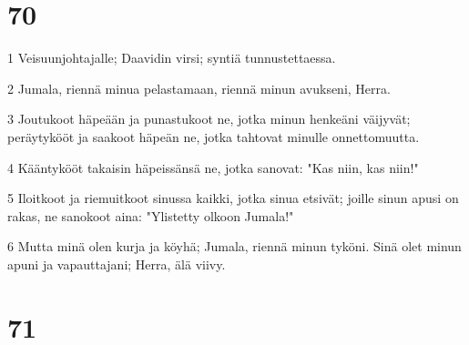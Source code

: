 \chapter{70}

\par 1 Veisuunjohtajalle; Daavidin virsi; syntiä tunnustettaessa.
\par 2 Jumala, riennä minua pelastamaan, riennä minun avukseni, Herra.
\par 3 Joutukoot häpeään ja punastukoot ne, jotka minun henkeäni väijyvät; peräytykööt ja saakoot häpeän ne, jotka tahtovat minulle onnettomuutta.
\par 4 Kääntykööt takaisin häpeissänsä ne, jotka sanovat: "Kas niin, kas niin!"
\par 5 Iloitkoot ja riemuitkoot sinussa kaikki, jotka sinua etsivät; joille sinun apusi on rakas, ne sanokoot aina: "Ylistetty olkoon Jumala!"
\par 6 Mutta minä olen kurja ja köyhä; Jumala, riennä minun tyköni. Sinä olet minun apuni ja vapauttajani; Herra, älä viivy.

\chapter{71}

